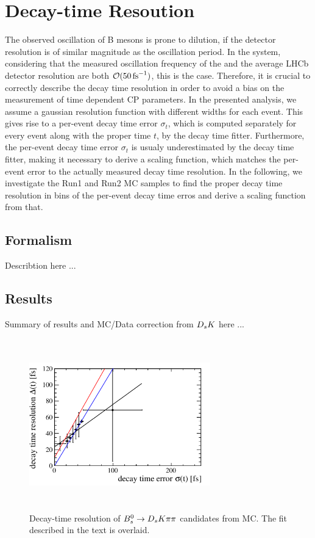 
\section{Decay-time Resoution}
\label{sec:Resolution}

The observed oscillation of B mesons is prone to dilution, if the detector resolution is of similar magnitude as the oscillation period. 
In the \Bs system, considering that the measured oscillation frequency of the \Bs \cite{PDG2014} and the average LHCb detector resolution \cite{LHCb-DP-2014-002} are both $\mathcal{O}(50 \mathrm{ \,fs}^{-1})$, this is the case.
Therefore, it is crucial to correctly describe the decay time resolution in order to avoid a bias on the measurement of time dependent CP parameters. \newline
In the presented analysis, we assume a gaussian resolution function with different widths for each event. 
This gives rise to a per-event decay time error $\sigma_{t}$, which is computed separately for every event along with the proper time $t$, by the decay time fitter. 
Furthermore, the per-event decay time error $\sigma_{t}$ is usualy underestimated by the decay time fitter, 
making it necessary to derive a scaling function, which matches the per-event error to the actually measured decay time resolution. 
In the following, we investigate the Run1 and Run2 MC samples to find the proper decay time resolution in bins of the per-event decay time erros and derive a scaling function from that.      


\subsection{Formalism}

Describtion here ...




\subsection{Results}

Summary of results and MC/Data correction from ${{D}_{s}}{K}$ here ...


\begin{figure}[h]
\includegraphics[height=7.4cm,width=0.7\textwidth]{figs/ProperTimeReso_MC.pdf}
\caption{Decay-time resolution of ${{B}^0_{s}}\rightarrow{\ensuremath{{D}_{s}}}{\ensuremath{K}}{\ensuremath{\pi}}{\ensuremath{\pi}}$ candidates from MC. The fit described in the text is overlaid.}
\label{fig:ResoFit_compared}
\end{figure}


